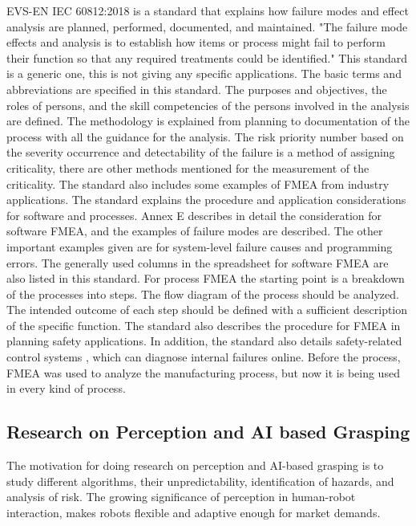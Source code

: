 {EVS-EN IEC 60812:2018\cite{author13} is a standard that explains how failure modes and effect analysis are planned, performed, documented, and maintained. "The failure mode effects and analysis is to establish how items or process might fail to perform their function so that any required treatments could be identified."\cite{author13} This standard is a generic one, this is not giving any specific applications. The basic terms and abbreviations are specified in this standard. The purposes and objectives, the roles of persons, and the skill competencies of the persons involved in the analysis are defined. The methodology is explained from planning to documentation of the process with all the guidance for the analysis. The risk priority number based on the severity occurrence and detectability of the failure is a method of assigning criticality, there are other methods mentioned for the measurement of the criticality. The standard also includes some examples of FMEA from industry applications. The standard explains the procedure and application considerations for software and processes. Annex E describes in detail the consideration for software FMEA, and the examples of failure modes are described. The other important examples given are for system-level failure causes and programming errors. The generally used columns in the spreadsheet for software FMEA are also listed in this standard.
For process FMEA the starting point is a breakdown of the processes into steps. The flow diagram of the process should be analyzed.  The intended outcome of each step should be defined with a sufficient description of the specific function. The standard also describes the procedure for FMEA in planning safety applications. In addition, the standard also details safety-related control systems , which can diagnose internal failures online. Before the process, FMEA was used to analyze the manufacturing process, but now it is being used in every kind of process. 





 \subsection{\RaggedRight Research on Perception and AI based Grasping }{\normalfont\fontsize{14}{16}\bfseries} %

The motivation for doing research on perception and AI-based grasping is to study different algorithms, their unpredictability, identification of hazards, and analysis of risk. The growing significance of perception in human-robot interaction, makes robots flexible and adaptive enough for market demands.

}
